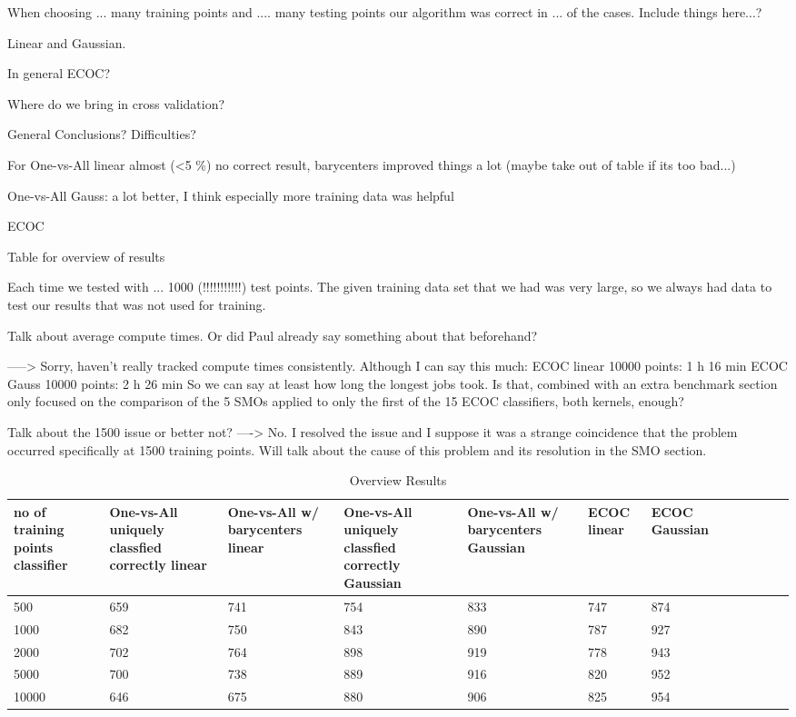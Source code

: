 When choosing ... many training points and .... many testing points our algorithm was correct in ... of the cases. Include things here...?


Linear and Gaussian.

In general ECOC?

Where do we bring in cross validation?

General Conclusions? Difficulties?

For One-vs-All linear almost (<5 \%) no correct result, barycenters improved things a lot  (maybe take out of table if its too bad...)

One-vs-All Gauss: a lot better, I think especially more training data was helpful

ECOC 

Table for overview of results 

Each time we tested with ... 1000 (!!!!!!!!!!!) test points. The given training data set that we had was very large, so we always had data to test our results that was not used for training. 

Talk about average compute times. Or did Paul already say something about that beforehand? 

----->
Sorry, haven't really tracked compute times consistently. Although I can say this much: 
ECOC linear 10000 points: 1 h 16 min
ECOC Gauss 10000 points: 2 h 26 min
So we can say at least how long the longest jobs took. Is that, combined with an extra benchmark section only focused on the comparison of the 5 SMOs applied to only the first of the  15 ECOC classifiers, both kernels, enough?


Talk about the 1500 issue or better not?
----> No. I resolved the issue and I suppose it was a strange coincidence that the problem occurred specifically at 1500 training points. Will talk about the cause of this problem and its resolution in the SMO section.


\begin{table}[ht!]
	\centering
	\caption{Overview Results}
	\begin{tabular}{|l|l|l|l|l|l|l|l|l|l|l|l|} \hline
\multicolumn{1}{|p{2cm}|}{no of training points classifier} & \multicolumn{1}{p{2cm}|}{One-vs-All uniquely classfied correctly linear} & \multicolumn{1}{p{2cm}|}{One-vs-All w/ barycenters linear} & \multicolumn{1}{p{2cm}|}{One-vs-All uniquely classfied correctly Gaussian} &  \multicolumn{1}{p{2cm}|}{One-vs-All w/ barycenters Gaussian} & \multicolumn{1}{p{2cm}|}{ECOC linear} & \multicolumn{1}{p{2cm}|}{ECOC Gaussian} \\ \hline \hline
	500	& 659 & 741 & 754 & 833 & 747 & 874 \\ \hline
	1000	& 682 & 750 & 843 & 890 & 787 & 927 \\ \hline
	2000	& 702 & 764 & 898 & 919 & 778 & 943 \\ \hline
	5000	& 700 & 738 & 889 & 916 & 820 & 952 \\ \hline
	10000	& 646 & 675 & 880 & 906 & 825 & 954 \\ \hline
	\end{tabular}
\end{table}

